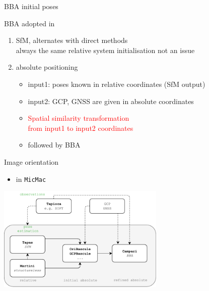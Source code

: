 \documentclass{beamer}
\begin{document}
	\begin{frame}{BBA initial poses}
	
	BBA adopted in
	\begin{enumerate}
		\item<1-> SfM, alternates with direct methods\\ always the same relative system initialisation not an issue
		\item<2-> absolute positioning
		\begin{itemize}
			\item<2-> input1: poses known in relative coordinates (SfM output)
			\item<2-> input2: GCP, GNSS are given in absolute coordinates 
			\item<3-> \textcolor{red}{Spatial similarity transformation \\from input1 to input2 coordinates}
	 		\item<4-> {followed by BBA}
	 		
		\end{itemize}							
	\end{enumerate}		
			 
 	
	\end{frame}
	
	
		\begin{frame}{Image orientation}

		\begin{itemize}
			\item in \texttt{MicMac}
		\end{itemize}
				
		\centering 
		\includegraphics[width=8cm]{images/MicMac_pose_estim_architecture.pdf}	
		
		\end{frame}	
\end{document}
